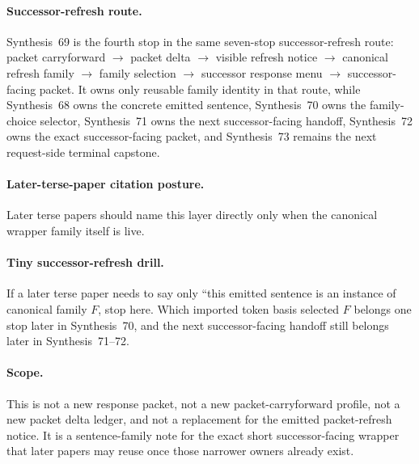 \documentclass[11pt]{article}
\begin{document}
\paragraph{Successor-refresh route.}
Synthesis~69 is the fourth stop in the same seven-stop successor-refresh route: packet carryforward $\rightarrow$ packet delta $\rightarrow$ visible refresh notice $\rightarrow$ canonical refresh family $\rightarrow$ family selection $\rightarrow$ successor response menu $\rightarrow$ successor-facing packet.
It owns only reusable family identity in that route, while Synthesis~68 owns the concrete emitted sentence, Synthesis~70 owns the family-choice selector, Synthesis~71 owns the next successor-facing handoff, Synthesis~72 owns the exact successor-facing packet, and Synthesis~73 remains the next request-side terminal capstone.

\paragraph{Later-terse-paper citation posture.}
Later terse papers should name this layer directly only when the canonical wrapper family itself is live.

\paragraph{Tiny successor-refresh drill.}
If a later terse paper needs to say only ``this emitted sentence is an instance of canonical family $F$, stop here. Which imported token basis selected $F$ belongs one stop later in Synthesis~70, and the next successor-facing handoff still belongs later in Synthesis~71--72.

\paragraph{Scope.}
This is not a new response packet, not a new packet-carryforward profile, not a new packet delta ledger, and not a replacement for the emitted packet-refresh notice.
It is a sentence-family note for the exact short successor-facing wrapper that later papers may reuse once those narrower owners already exist.
\end{document}
